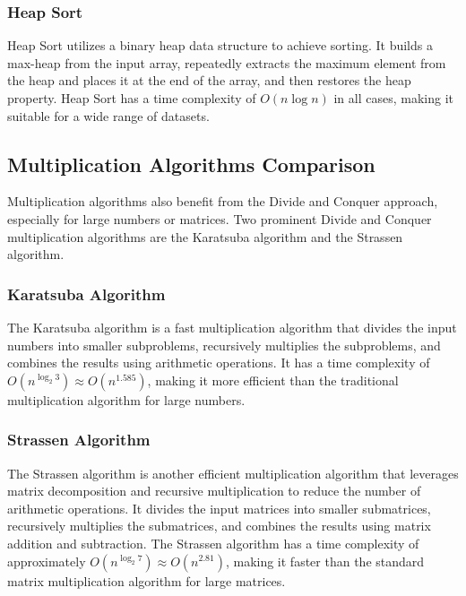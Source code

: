 \documentclass[12pt]{book} %
\begin{document}
\subsubsection{Heap Sort}

Heap Sort utilizes a binary heap data structure to achieve sorting. It builds a max-heap from the input array, repeatedly extracts the maximum element from the heap and places it at the end of the array, and then restores the heap property. Heap Sort has a time complexity of \(O(n \log n)\) in all cases, making it suitable for a wide range of datasets.

\subsection{Multiplication Algorithms Comparison}

Multiplication algorithms also benefit from the Divide and Conquer approach, especially for large numbers or matrices. Two prominent Divide and Conquer multiplication algorithms are the Karatsuba algorithm and the Strassen algorithm.

\subsubsection{Karatsuba Algorithm}

The Karatsuba algorithm is a fast multiplication algorithm that divides the input numbers into smaller subproblems, recursively multiplies the subproblems, and combines the results using arithmetic operations. It has a time complexity of \(O(n^{\log_2 3}) \approx O(n^{1.585})\), making it more efficient than the traditional multiplication algorithm for large numbers.

\subsubsection{Strassen Algorithm}

The Strassen algorithm is another efficient multiplication algorithm that leverages matrix decomposition and recursive multiplication to reduce the number of arithmetic operations. It divides the input matrices into smaller submatrices, recursively multiplies the submatrices, and combines the results using matrix addition and subtraction. The Strassen algorithm has a time complexity of approximately \(O(n^{\log_2 7}) \approx O(n^{2.81})\), making it faster than the standard matrix multiplication algorithm for large matrices.
\end{document}
